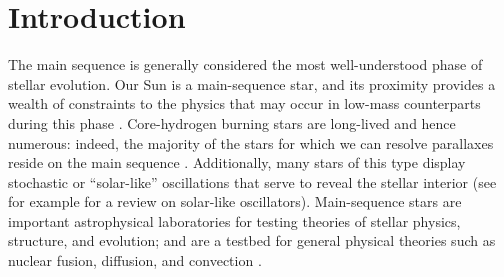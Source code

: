 



\section{Introduction} 

The main sequence is generally considered the most well-understood phase of stellar evolution. 
Our Sun is a main-sequence star, and its proximity provides a wealth of constraints to the physics that may occur in low-mass counterparts during this phase \citep{2015SSRv..196...49B,2016lrsp...13....2b}. 
Core-hydrogen burning stars are long-lived and hence numerous: indeed, the majority of the stars for which we can resolve parallaxes reside on the main sequence \citep{2016arXiv160904172G}. 
Additionally, many stars of this type display stochastic or ``solar-like'' oscillations that serve to reveal the stellar interior (see for example \citealt{2013ARA&A..51..353C} for a review on solar-like oscillators).  
Main-sequence stars are important astrophysical laboratories for testing theories of stellar physics, structure, and evolution; and are a testbed for general physical theories such as nuclear fusion, diffusion, and convection \citep{1994MNRAS.269.1137B,1990ARAA..28..263S}. 

